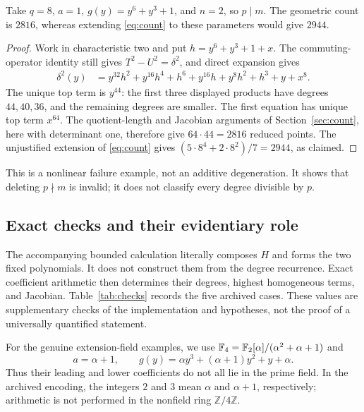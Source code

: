 \begin{example}\label{ex:failure}
Take $q=8$, $a=1$, $g(y)=y^6+y^3+1$, and $n=2$, so $p\mid m$.
The geometric count is $2816$, whereas extending
\eqref{eq:count} to these parameters would give $2944$.
\end{example}

\begin{proof}
Work in characteristic two and put $h=y^6+y^3+1+x$.
The commuting-operator identity still gives $T^2-U^2=\delta^2$, and
direct expansion gives
\begin{align*}
 \delta^2(y)
 &=y^{32}h^2+y^{16}h^4+h^6
   +y^{16}h+y^8h^2+h^3+y+x^8.
\end{align*}
The unique top term is $y^{44}$: the first three displayed products
have degrees $44,40,36$, and the remaining degrees are smaller.
The first equation has unique top term $x^{64}$. The quotient-length
and Jacobian arguments of Section~\ref{sec:count}, here with determinant
one, therefore give $64\cdot44=2816$ reduced points.
The unjustified extension of \eqref{eq:count} gives
$(5\cdot8^4+2\cdot8^2)/7=2944$, as claimed.
\end{proof}

This is a nonlinear failure example, not an additive degeneration. It
shows that deleting $p\nmid m$ is invalid; it does not classify every
degree divisible by $p$.

\subsection{Exact checks and their evidentiary role}

The accompanying bounded calculation literally composes $H$ and forms
the two fixed polynomials. It does not construct them from the degree
recurrence. Exact coefficient arithmetic then determines their degrees,
highest homogeneous terms, and Jacobian. Table~\ref{tab:checks} records
the five archived cases. These values are supplementary checks of the
implementation and hypotheses, not the proof of a universally
quantified statement.

For the genuine extension-field examples, we use
$\mathbb F_4=\mathbb F_2[\alpha]/(\alpha^2+\alpha+1)$ and
\[
 a=\alpha+1,\qquad
 g(y)=\alpha y^3+(\alpha+1)y^2+y+\alpha.
\]
Thus their leading and lower coefficients do not all lie in the prime
field. In the archived encoding, the integers $2$ and $3$ mean
$\alpha$ and $\alpha+1$, respectively; arithmetic is not performed in
the nonfield ring $\mathbb Z/4\mathbb Z$.

